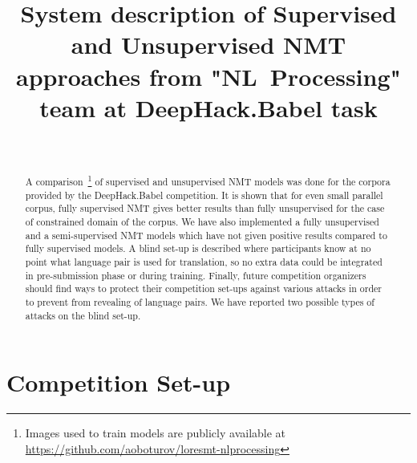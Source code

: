 \documentclass[]{article}
\begin{document}
\begin{acronym}
\end{acronym}

\title{\bf System description of Supervised and Unsupervised  \acl{NMT} approaches from {"NL~Processing"} team at DeepHack.Babel task}
\author{ \hfill  {}\\
\AND
         \hfill {}
}

\maketitle
\pagestyle{empty}

\begin{abstract}
A comparison~\footnote{Images used to train models are publicly available at \url{https://github.com/aoboturov/loresmt-nlprocessing}} of supervised and unsupervised \ac{NMT} models was done for the corpora provided by the DeepHack.Babel competition.
It is shown that for even small parallel corpus, fully supervised \ac{NMT} gives better results than fully unsupervised for the case of constrained domain of the corpus.
We have also implemented a fully unsupervised and a semi-supervised \ac{NMT} models which have not given positive results compared to fully supervised models.
A blind set-up is described where participants know at no point what language pair is used for translation, so no extra data could be integrated in pre-submission phase or during training.
Finally, future competition organizers should find ways to protect their competition set-ups against various attacks in order to prevent from revealing of language pairs.
We have reported two possible types of attacks on the blind set-up.
\end{abstract}

\acresetall
\section{Competition Set-up}
\label{sect:set_up}
\end{document}

